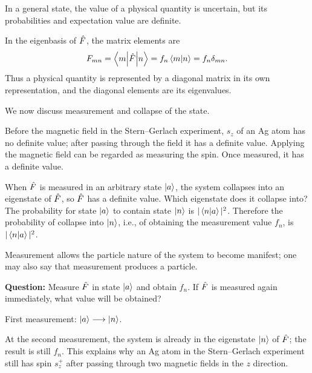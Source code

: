 In a general state, the value of a physical quantity is uncertain, but its probabilities and expectation value are definite.

In the eigenbasis of $\hat{F}$, the matrix elements are
\begin{equation}
F_{mn}=\left\langle m\middle|\hat{F}\middle|n\right\rangle=f_n\left\langle m\middle|n\right\rangle=f_n\delta_{mn}.
\end{equation}
Thus a physical quantity is represented by a diagonal matrix in its own representation, and the diagonal elements are its eigenvalues.

We now discuss measurement and collapse of the state.

Before the magnetic field in the Stern--Gerlach experiment, $s_z$ of an Ag atom has no definite value; after passing through the field it has a definite value. Applying the magnetic field can be regarded as measuring the spin. Once measured, it has a definite value.

When $\hat{F}$ is measured in an arbitrary state $\left|a\right\rangle$, the system collapses into an eigenstate of $\hat{F}$, so $\hat{F}$ has a definite value. Which eigenstate does it collapse into? The probability for state $\left|a\right\rangle$ to contain state $\left|n\right\rangle$ is $|\left\langle n\middle|a\right\rangle|^2$. Therefore the probability of collapse into $\left|n\right\rangle$, i.e., of obtaining the measurement value $f_n$, is $|\left\langle n\middle|a\right\rangle|^2$.

Measurement allows the particle nature of the system to become manifest; one may also say that measurement produces a particle.

\textbf{Question:} Measure $\hat{F}$ in state $\left|a\right\rangle$ and obtain $f_n$. If $\hat{F}$ is measured again immediately, what value will be obtained?

First measurement: $\left|a\right\rangle\longrightarrow\left|n\right\rangle$.

At the second measurement, the system is already in the eigenstate $\left|n\right\rangle$ of $\hat{F}$; the result is still $f_n$. This explains why an Ag atom in the Stern--Gerlach experiment still has spin $s_z^+$ after passing through two magnetic fields in the $z$ direction.


